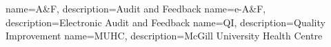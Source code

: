  {
    name=A\&F,
    description={Audit and Feedback}
}
 {
    name=e-A\&F,
    description={Electronic Audit and Feedback}
}
 {
    name=QI,
    description={Quality Improvement}
}
 {
    name=MUHC,
    description={McGill University Health Centre}
}